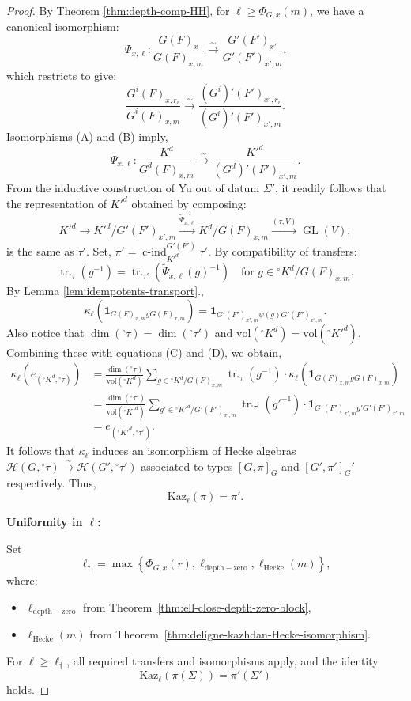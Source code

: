 \documentclass[american]{article}
\numberwithin{equation}{section}
\numberwithin{figure}{section}
\theoremstyle{plain}
\theoremstyle{definition}
\theoremstyle{remark}
\DeclareMathOperator{\tr}{tr}
\begin{document}
\begin{proof}
By Theorem \ref{thm:depth-comp-HH}, for \(\ell \geq \Phi_{G,x}(m)\), we have a canonical isomorphism:
\[
\Psi_{x,\ell}: \frac{G(F)_{x}}{G(F)_{x,m}} \stackrel{\sim}{\longrightarrow} \frac{G'(F')_{x'}}{G'(F')_{x',m}}.\tag{A}
\]
which restricts to give:
  \[
  \frac{G^i(F)_{x,r_i}}{G^i(F)_{x,m}} \xrightarrow{\sim} \frac{(G^i)'(F')_{x',r_i}}{(G^i)'(F')_{x',m}}.
  \tag{B}\]
Isomorphisms (A) and (B) imply,
\[
\tilde{\Psi}_{x,\ell}: \frac{K^d}{G^d(F)_{x,m}} \xrightarrow{\sim} \frac{K'^d}{(G^d)'(F')_{x',m}}.
\]
From the inductive construction of Yu out of datum \(\Sigma'\), it readily follows that the representation of \(K'^d\) obtained by composing:
\[
K'^d \to K'^d/G'(F')_{x',m} \xrightarrow{\tilde{\Psi}_{x,\ell}^{-1}} K^d/G(F)_{x,m} \xrightarrow{(\tau,V)} \operatorname{GL}(V),
\]
is the same as \(\tau'\). Set, \(\pi' = \operatorname{c-ind}_{K'^d}^{G'(F')} \tau'\).
By compatibility of transfers:
\[
\tr_{{}^{\circ}\tau}(g^{-1}) = \tr_{{}^{\circ}\tau'}(\tilde{\Psi}_{x,\ell}(g)^{-1}) 
\quad \text{for } g \in {}^{\circ}K^{d} / G(F)_{x,m}. \tag{C}
\]
By Lemma \ref{lem:idempotents-transport}.,
\[
\kappa_\ell(\mathbf{1}_{G(F)_{x,m} g G(F)_{x,m}}) 
= \mathbf{1}_{G'(F')_{x',m} \psi(g) G'(F')_{x',m}}. \tag{D}
\]
Also notice that \(\dim({}^{\circ}\tau) = \dim({}^{\circ}\tau')\) and \(\mathrm{vol}({}^{\circ}K^{d}) = \mathrm{vol}({}^{\circ}K'^{d})\). Combining these with equations (C) and (D), we obtain,
\begin{align*}
\kappa_\ell(e_{({}^{\circ}K^{d}, {}^{\circ}\tau)}) 
&= \frac{\dim({}^{\circ}\tau)}{\mathrm{vol}({}^{\circ}K^{d})} 
   \sum_{g \in {}^{\circ}K^{d} / G(F)_{x,m}} 
   \tr_{{}^{\circ}\tau}(g^{-1}) \cdot 
   \kappa_\ell(\mathbf{1}_{G(F)_{x,m} g G(F)_{x,m}}) \\
&= \frac{\dim({}^{\circ}\tau')}{\mathrm{vol}({}^{\circ}K'^{d})} 
   \sum_{g' \in {}^{\circ}K'^{d} / G'(F')_{x',m}} 
   \tr_{{}^{\circ}\tau'}(g'^{-1}) \cdot 
   \mathbf{1}_{G'(F')_{x',m} g' G'(F')_{x',m}} \\
&= e_{({}^{\circ}K'^{d}, {}^{\circ}\tau')}.
\end{align*}
It follows that \(\kappa_\ell\) induces an isomorphism of Hecke algebras \(\mathcal{H}(G,{}^\circ\tau)\xrightarrow{\sim}\mathcal{H}(G',{}^\circ\tau') \) associated to types \([G,\pi]_G\) and \([G',\pi']_G'\) respectively. 
Thus,
\[
\mathrm{Kaz}_\ell(\pi) = \pi'.
\]

\textbf{Uniformity in \(\ell\):}

Set
\[
\ell_\dagger = \max\left\{ \Phi_{G,x}(r), \ell_{\mathrm{depth-zero}}, \ell_{\mathrm{Hecke}}(m) \right\},
\]
where:
\begin{itemize}
  \item \(\ell_{\mathrm{depth-zero}}\) from Theorem~\ref{thm:ell-close-depth-zero-block},
  \item \(\ell_{\mathrm{Hecke}}(m)\) from Theorem~\ref{thm:deligne-kazhdan-Hecke-isomorphism}.
\end{itemize}

For \(\ell \geq \ell_\dagger\), all required transfers and isomorphisms apply, and the identity
\[
\mathrm{Kaz}_\ell(\pi(\Sigma)) = \pi'(\Sigma')
\]
holds.

\end{proof}
\end{document}
